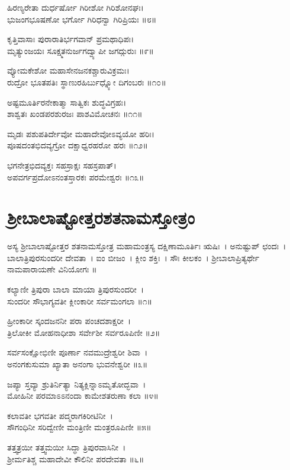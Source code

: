 ಹಿರಣ್ಯರೇತಾ ದುರ್ಧರ್ಷೋ ಗಿರೀಶೋ ಗಿರಿಶೋನಘಃ।\\
ಭುಜಂಗಭೂಷಣೋ ಭರ್ಗೋ ಗಿರಿಧನ್ವಾ ಗಿರಿಪ್ರಿಯಃ ॥೮॥

ಕೃತ್ತಿವಾಸಾಃ ಪುರಾರಾತಿರ್ಭಗವಾನ್ ಪ್ರಮಥಾಧಿಪಃ।\\
ಮೃತ್ಯುಂಜಯಃ ಸೂಕ್ಷ್ಮತನುರ್ಜಗದ್ವ್ಯಾಪೀ ಜಗದ್ಗುರುಃ ॥೯॥

ವ್ಯೋಮಕೇಶೋ ಮಹಾಸೇನಜನಕಶ್ಚಾರುವಿಕ್ರಮಃ।\\
ರುದ್ರೋ ಭೂತಪತಿಃ ಸ್ಥಾಣುರಹಿರ್ಬುಧ್ನ್ಯೋ ದಿಗಂಬರಃ ॥೧೦॥

ಅಷ್ಟಮೂರ್ತಿರನೇಕಾತ್ಮಾ ಸಾತ್ವಿಕಃ ಶುದ್ಧವಿಗ್ರಹಃ।\\
ಶಾಶ್ವತಃ ಖಂಡಪರಶುರಜಃ ಪಾಶವಿಮೋಚನಃ ॥೧೧॥

ಮೃಡಃ ಪಶುಪತಿರ್ದೇವೋ ಮಹಾದೇವೋಽವ್ಯಯೋ ಹರಿಃ।\\
ಪೂಷದಂತಭಿದವ್ಯಗ್ರೋ ದಕ್ಷಾಧ್ವರಹರೋ ಹರಃ ॥೧೨॥

ಭಗನೇತ್ರಭಿದವ್ಯಕ್ತಃ ಸಹಸ್ರಾಕ್ಷಃ ಸಹಸ್ರಪಾತ್।\\
ಅಪವರ್ಗಪ್ರದೋಽನಂತಸ್ತಾರಕಃ ಪರಮೇಶ್ವರಃ ॥೧೩॥

\section{ಶ್ರೀಬಾಲಾಷ್ಟೋತ್ತರಶತನಾಮಸ್ತೋತ್ರಂ}
ಅಸ್ಯ ಶ್ರೀಬಾಲಾಷ್ಟೋತ್ತರ ಶತನಾಮಸ್ತೋತ್ರ ಮಹಾಮಂತ್ರಸ್ಯ  ದಕ್ಷಿಣಾಮೂರ್ತಿಃ ಋಷಿಃ~। ಅನುಷ್ಟುಪ್ ಛಂದಃ~। ಬಾಲಾತ್ರಿಪುರಸುಂದರೀ ದೇವತಾ~। ಐಂ ಬೀಜಂ~। ಕ್ಲೀಂ ಶಕ್ತಿಃ~। ಸೌಃ ಕೀಲಕಂ~।  ಶ್ರೀಬಾಲಾಪ್ರಿತ್ಯರ್ಥೇ ನಾಮಪಾರಾಯಣೇ ವಿನಿಯೋಗಃ ॥


ಕಲ್ಯಾಣೀ ತ್ರಿಪುರಾ ಬಾಲಾ ಮಾಯಾ ತ್ರಿಪುರಸುಂದರೀ~।\\
ಸುಂದರೀ ಸೌಭಾಗ್ಯವತೀ ಕ್ಲೀಂಕಾರೀ ಸರ್ವಮಂಗಲಾ ॥೧॥

ಹ್ರೀಂಕಾರೀ ಸ್ಕಂದಜನನೀ ಪರಾ ಪಂಚದಶಾಕ್ಷರೀ~।\\
ತ್ರಿಲೋಕೀ ಮೋಹನಾಧೀಶಾ ಸರ್ವೇಶೀ ಸರ್ವರೂಪಿಣೀ ॥೨॥

ಸರ್ವಸಂಕ್ಷೋಭಿಣೀ ಪೂರ್ಣಾ ನವಮುದ್ರೇಶ್ವರೀ ಶಿವಾ~।\\
ಅನಂಗಕುಸುಮಾ ಖ್ಯಾತಾ ಅನಂಗಾ ಭುವನೇಶ್ವರೀ ॥೩॥

ಜಪ್ಯಾ ಸ್ತವ್ಯಾ ಶ್ರುತಿರ್ನಿತ್ಯಾ ನಿತ್ಯಕ್ಲಿನ್ನಾಽಮೃತೋದ್ಭವಾ~।\\
ಮೋಹಿನೀ ಪರಮಾಽಽನಂದಾ ಕಾಮೇಶತರುಣಾ ಕಲಾ ॥೪॥

ಕಲಾವತೀ ಭಗವತೀ ಪದ್ಮರಾಗಕಿರೀಟಿನೀ~।\\
ಸೌಗಂಧಿನೀ ಸರಿದ್ವೇಣೀ ಮಂತ್ರಿಣೀ ಮಂತ್ರರೂಪಿಣೀ ॥೫॥

ತತ್ತ್ವತ್ರಯೀ ತತ್ತ್ವಮಯೀ ಸಿದ್ಧಾ ತ್ರಿಪುರವಾಸಿನೀ~।\\
ಶ್ರೀರ್ಮತಿಶ್ಚ ಮಹಾದೇವೀ ಕೌಲಿನೀ ಪರದೇವತಾ ॥೬॥

